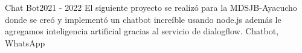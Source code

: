 
\begin{projects}

				
	\project
	{Chat Bot}{2021 - 2022}
	{ }
	{El siguiente proyecto se realizó para la MDSJB-Ayacucho donde se creó y implementó un chatbot increíble usando node.js además le agregamos inteligencia artificial gracias al servicio de dialogflow.}
	{Chatbot, WhatsApp}

\end{projects}